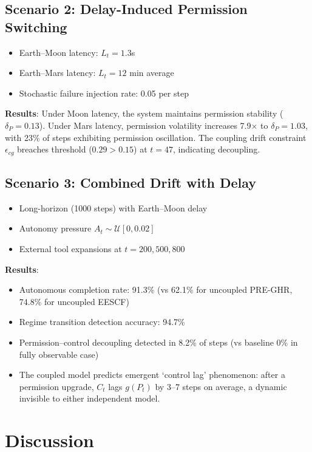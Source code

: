 \documentclass[conference]{IEEEtran}
\begin{document}
\subsection{Scenario 2: Delay-Induced Permission Switching}

\begin{itemize}
\item Earth--Moon latency: $L_t = 1.3$s
\item Earth--Mars latency: $L_t = 12$ min average
\item Stochastic failure injection rate: 0.05 per step
\end{itemize}

\textbf{Results}: Under Moon latency, the system maintains permission stability ($\delta_P = 0.13$). Under Mars latency, permission volatility increases 7.9$\times$ to $\delta_P = 1.03$, with 23\% of steps exhibiting permission oscillation. The coupling drift constraint $\epsilon_{cg}$ breaches threshold ($0.29 > 0.15$) at $t=47$, indicating decoupling.

\subsection{Scenario 3: Combined Drift with Delay}

\begin{itemize}
\item Long-horizon (1000 steps) with Earth--Moon delay
\item Autonomy pressure $A_t \sim \mathcal{U}[0, 0.02]$
\item External tool expansions at $t=200, 500, 800$
\end{itemize}

\textbf{Results}: 
\begin{itemize}
\item Autonomous completion rate: 91.3\% (vs 62.1\% for uncoupled PRE-GHR, 74.8\% for uncoupled EESCF)
\item Regime transition detection accuracy: 94.7\%
\item Permission--control decoupling detected in 8.2\% of steps (vs baseline 0\% in fully observable case)
\item The coupled model predicts emergent `control lag' phenomenon: after a permission upgrade, $C_t$ lags $g(P_t)$ by 3--7 steps on average, a dynamic invisible to either independent model.
\end{itemize}

\section{Discussion}
\end{document}
